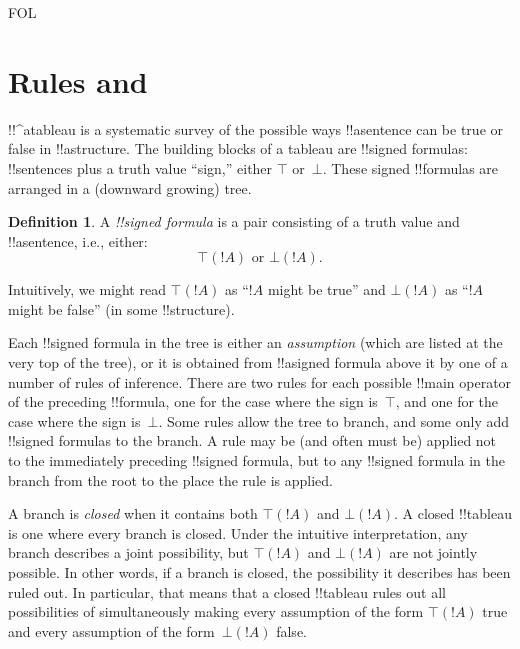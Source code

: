 \documentclass[10pt,a4paper]{article}
\theoremstyle{plain}
\theoremstyle{definition}
\newtheorem{defn}[thm]{Definition}
\theoremstyle{remark}
\newcommand*{\olfileid}[3]{}
\newcommand*{\olsection}[1]{\section*{#1}}
\providecommand{\sFmla}[2]{#1(#2)}
\providecommand{\True}{\top}
\providecommand{\False}{\bot}
\providecommand{\iftag}[1]{#1}
\begin{document}



\iftag{FOL}
      {\olfileid{fol}{tab}{rul}}
      {\olfileid{pl}{tab}{rul}}

\olsection{Rules and }

!!^a{tableau} is a systematic survey of the possible ways
!!a{sentence} can be true or false in !!a{structure}. The building
blocks of a tableau are !!{signed formula}s: !!{sentence}s plus a
truth value ``sign,'' either $\True$ or~$\False$. These signed
!!{formula}s are arranged in a (downward growing) tree.

\begin{defn}
  A \emph{!!{signed formula}} is a pair consisting of a truth value
  and !!a{sentence}, i.e., either:
  \[
  \sFmla{\True}{!A} \text{ or } \sFmla{\False}{!A}.
  \]
\end{defn}

Intuitively, we might read $\sFmla{\True}{!A}$ as ``$!A$ might be
true'' and $\sFmla{\False}{!A}$ as ``$!A$ might be false'' (in some
!!{structure}).

Each !!{signed formula} in the tree is either an \emph{assumption}
(which are listed at the very top of the tree), or it is obtained from
!!a{signed formula} above it by one of a number of rules of
inference. There are two rules for each possible !!{main operator} of
the preceding !!{formula}, one for the case where the sign is~$\True$,
and one for the case where the sign is~$\False$. Some rules allow the
tree to branch, and some only add !!{signed formula}s to the branch.
A rule may be (and often must be) applied not to the immediately
preceding !!{signed formula}, but to any !!{signed formula} in the
branch from the root to the place the rule is applied.

A branch is \emph{closed} when it contains both $\sFmla{\True}{!A}$
and $\sFmla{\False}{!A}$. A closed !!{tableau} is one where every branch
is closed.  Under the intuitive interpretation, any branch describes a
joint possibility, but $\sFmla{\True}{!A}$ and $\sFmla{\False}{!A}$
are not jointly possible. In other words, if a branch is closed, the
possibility it describes has been ruled out. In particular, that means
that a closed !!{tableau} rules out all possibilities of simultaneously
making every assumption of the form $\sFmla{\True}{!A}$ true and every
assumption of the form~$\sFmla{\False}{!A}$ false.
\end{document}

